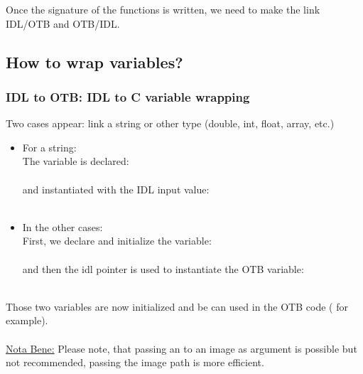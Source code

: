 Once the signature of the functions is written, we need to make the link IDL/OTB and OTB/IDL.

\subsection{How to wrap variables?}
\subsubsection{IDL to OTB: IDL to C variable wrapping}
Two cases appear: link a string or other type (double, int, float, array, etc.)

\begin{itemize}
\item For a string:\\
  The variable is declared:\\ 
  \\
  and instantiated with the IDL input value:\\ \\
\item In the other cases:\\
  First, we declare and initialize the variable:\\ \\
  and then the idl pointer is used to instantiate the OTB variable:\\ \\
\end{itemize}
Those two variables are now initialized and be can used in the OTB code ( for example).
\\
\\
\underline{Nota Bene:} Please note, that passing an  to an image as argument is possible but not recommended, passing the image path is more efficient.


